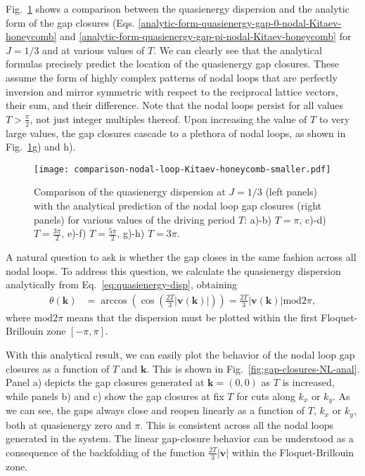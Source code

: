\documentclass[aps,prb,twocolumn,superscriptaddress,groupedaddress]{revtex4}
\begin{document}
Fig.~\ref{fig:comparison-nodal-loop-Kitaev-honeycomb-smaller} shows a comparison between the quasienergy dispersion and the analytic form of the gap closures (Eqs. \eqref{analytic-form-quasienergy-gap-0-nodal-Kitaev-honeycomb} and \eqref{analytic-form-quasienergy-gap-pi-nodal-Kitaev-honeycomb} for $J=1/3$ and at various values of $T$.
We can clearly see that the analytical formulas precisely predict the location of the quasienergy gap closures.
These assume the form of highly complex patterns of nodal loops that are perfectly inversion and mirror symmetric with respect to the reciprocal lattice vectors, their sum, and their difference. 
Note that the nodal loops persist for all values $T>\frac{\pi}{2}$, not just integer multiples thereof.
Upon increasing the value of $T$ to very large values, the gap closures cascade to a plethora of nodal loops, as shown in Fig.~\ref{fig:comparison-nodal-loop-Kitaev-honeycomb-smaller}g) and h).

\begin{figure}
\centering
\texttt{[image: comparison-nodal-loop-Kitaev-honeycomb-smaller.pdf]}
\caption{Comparison of the quasienergy dispersion at $J=1/3$ (left panels) with the analytical prediction of the nodal loop gap closures (right panels) for various values of the driving period $T$: a)-b) $T=\pi$, c)-d) $T=\frac{3\pi}{2}$, e)-f) $T=\frac{5\pi}{2}$, g)-h) $T=3\pi$.}
\label{fig:comparison-nodal-loop-Kitaev-honeycomb-smaller}
\end{figure}

A natural question to ask is whether the gap closes in the same fashion across all nodal loops.
To address this question, we calculate the quasienergy dispersion analytically from Eq.~\eqref{eq:quasienergy-disp}, obtaining
%
\begin{align}
\theta(\mathbf{k}) &= \arccos \left( \cos \left( \frac{2T}{3} | \mathbf{v}(\mathbf{k})| \right) \right) = \frac{2T}{3} | \mathbf{v}(\mathbf{k})| \text{mod} 2\pi,
\end{align}
%
where $\text{mod} 2\pi$ means that the dispersion must be plotted within the first Floquet-Brillouin zone $[-\pi, \pi]$.

With this analytical result, we can easily plot the behavior of the nodal loop gap closures as a function of $T$ and $\mathbf{k}$.
This is shown in Fig.~\ref{fig:gap-closures-NL-anal}.
Panel a) depicts the gap closures generated at $\mathbf{k}=(0,0)$ as $T$ is increased, while panels b) and c)  show the gap closures at fix $T$ for cuts along $k_x$ or $k_y$.
As we can see, the gaps always close and reopen linearly as a function of $T$, $k_x$ or $k_y$, both at quasienergy zero and $\pi$.
This is consistent across all the nodal loops generated in the system.
The linear gap-closure behavior can be understood as a consequence of the backfolding of the function $\frac{2T}{3} | \mathbf{v}|$ within the Floquet-Brillouin zone.
\end{document}
